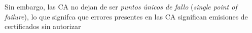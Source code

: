 Sin embargo, las CA no dejan de ser \emph{puntos únicos de fallo} (\emph{single point of failure}), lo que signifca que errores presentes en las CA significan emisiones de certificados sin autorizar \autocite{PKICAErrors}



\clearpage
\printbibliography


